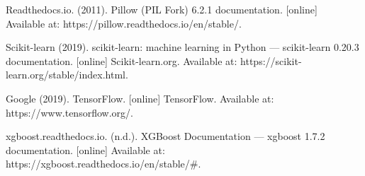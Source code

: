 \documentclass[12pt,runningheads]{llncs}
\begin{document}
\begin{thebibliography}{20}
Readthedocs.io. (2011). Pillow (PIL Fork) 6.2.1 documentation. [online]\\
Available at: https://pillow.readthedocs.io/en/stable/.

Scikit-learn (2019). scikit-learn: machine learning in Python — scikit-learn
0.20.3 documentation. [online] Scikit-learn.org. Available at:
https://scikit-learn.org/stable/index.html.

Google (2019). TensorFlow. [online] TensorFlow. Available at:
https://www.tensorflow.org/.

xgboost.readthedocs.io. (n.d.). XGBoost Documentation — xgboost 1.7.2
documentation. [online] Available at:
https://xgboost.readthedocs.io/en/stable/\#.

\end{thebibliography}
\end{document}
